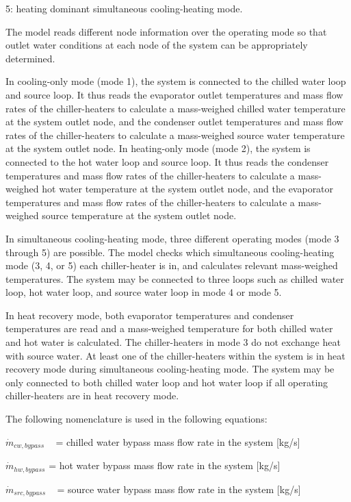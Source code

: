 5: heating dominant simultaneous cooling-heating mode.

The model reads different node information over the operating mode so that outlet water conditions at each node of the system can be appropriately determined.

In cooling-only mode (mode 1), the system is connected to the chilled water loop and source loop. It thus reads the evaporator outlet temperatures and mass flow rates of the chiller-heaters to calculate a mass-weighed chilled water temperature at the system outlet node, and the condenser outlet temperatures and mass flow rates of the chiller-heaters to calculate a mass-weighed source water temperature at the system outlet node. In heating-only mode (mode 2), the system is connected to the hot water loop and source loop. It thus reads the condenser temperatures and mass flow rates of the chiller-heaters to calculate a mass-weighed hot water temperature at the system outlet node, and the evaporator temperatures and mass flow rates of the chiller-heaters to calculate a mass-weighed source temperature at the system outlet node.

In simultaneous cooling-heating mode, three different operating modes (mode 3 through 5) are possible. The model checks which simultaneous cooling-heating mode (3, 4, or 5) each chiller-heater is in, and calculates relevant mass-weighed temperatures. The system may be connected to three loops such as chilled water loop, hot water loop, and source water loop in mode 4 or mode 5.

In heat recovery mode, both evaporator temperatures and condenser temperatures are read and a mass-weighed temperature for both chilled water and hot water is calculated. The chiller-heaters in mode 3 do not exchange heat with source water. At least one of the chiller-heaters within the system is in heat recovery mode during simultaneous cooling-heating mode. The system may be only connected to both chilled water loop and hot water loop if all operating chiller-heaters are in heat recovery mode.

The following nomenclature is used in the following equations:

\({\dot m_{cw,bypass}}\) ~ = chilled water bypass mass flow rate in the system {[}kg/s{]}

\({\dot m_{hw,bypass}}\) = hot water bypass mass flow rate in the system {[}kg/s{]}

\({\dot m_{src,bypass}}\) ~ = source water bypass mass flow rate in the system {[}kg/s{]}

